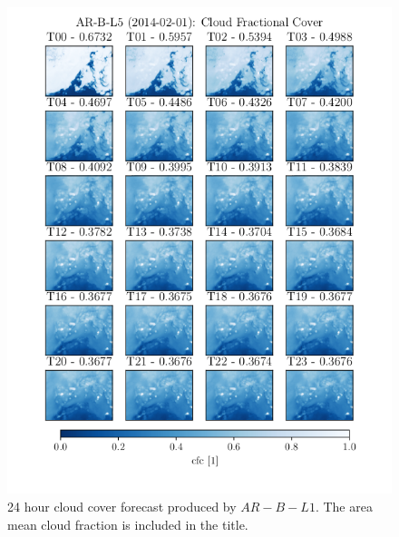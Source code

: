 \begin{figure}[ht]
    \centering
    \includegraphics{python_figs/AR-B-L5_timelapse_cloud_cover_24hrs_from_2014_02_01.png}
    \caption{24 hour cloud cover forecast produced by $AR-B-L1$. The area mean cloud fraction is included in the title.}
    \label{fig:timelapse_ar}
\end{figure}
